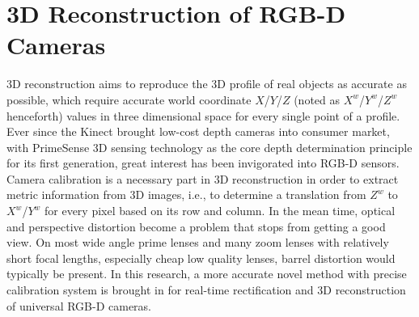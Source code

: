 \section{3D Reconstruction of RGB-D Cameras}

3D reconstruction aims to reproduce the 3D profile of real objects as accurate as possible, which require accurate world coordinate \(X\)/\(Y\)/\(Z\) (noted as \(X^{w}\)/\(Y^{w}\)/\(Z^{w}\)  henceforth) values in three dimensional space for every single point of a profile. Ever since the Kinect brought low-cost depth cameras into consumer market, with PrimeSense 3D sensing technology as the core depth determination principle for its first generation, great interest has been invigorated into RGB-D sensors. Camera calibration is a necessary part in 3D reconstruction in order to extract metric information from 3D images, i.e., to determine a translation from \(Z^{w}\) to \(X^{w}\)/\(Y^{w}\)  for every pixel based on its row and column. In the mean time, optical and perspective distortion become a problem that stops from getting a good view. On most wide angle prime lenses and many zoom lenses with relatively short focal lengths,  especially cheap low quality lenses, barrel distortion would typically be present. In this research, a more accurate novel method with precise calibration system is brought in for real-time rectification and 3D reconstruction of universal RGB-D cameras. 

